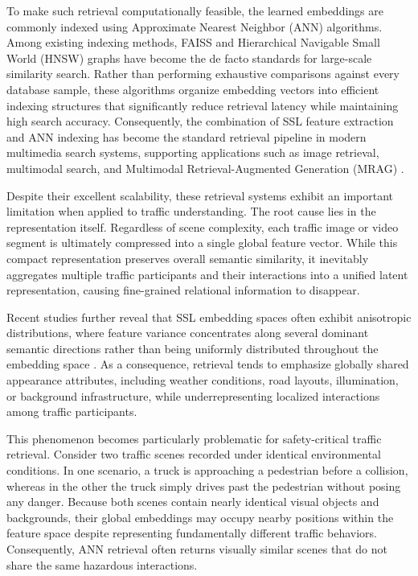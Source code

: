 \documentclass[a4paper, 11pt]{article} %
\begin{document}
To make such retrieval computationally feasible, the learned embeddings are commonly indexed using Approximate Nearest Neighbor (ANN) algorithms. Among existing indexing methods, FAISS \cite{douze2024faiss} and Hierarchical Navigable Small World (HNSW) graphs \cite{malkov2020hnsw} have become the de facto standards for large-scale similarity search. Rather than performing exhaustive comparisons against every database sample, these algorithms organize embedding vectors into efficient indexing structures that significantly reduce retrieval latency while maintaining high search accuracy. Consequently, the combination of SSL feature extraction and ANN indexing has become the standard retrieval pipeline in modern multimedia search systems, supporting applications such as image retrieval, multimodal search, and Multimodal Retrieval-Augmented Generation (MRAG) \cite{mei2025mrag,zhang2026rethinking}.

Despite their excellent scalability, these retrieval systems exhibit an important limitation when applied to traffic understanding. The root cause lies in the representation itself. Regardless of scene complexity, each traffic image or video segment is ultimately compressed into a single global feature vector. While this compact representation preserves overall semantic similarity, it inevitably aggregates multiple traffic participants and their interactions into a unified latent representation, causing fine-grained relational information to disappear.

Recent studies further reveal that SSL embedding spaces often exhibit anisotropic distributions, where feature variance concentrates along several dominant semantic directions rather than being uniformly distributed throughout the embedding space \cite{geometric2024ssl,chung2026global}. As a consequence, retrieval tends to emphasize globally shared appearance attributes, including weather conditions, road layouts, illumination, or background infrastructure, while underrepresenting localized interactions among traffic participants.

This phenomenon becomes particularly problematic for safety-critical traffic retrieval. Consider two traffic scenes recorded under identical environmental conditions. In one scenario, a truck is approaching a pedestrian before a collision, whereas in the other the truck simply drives past the pedestrian without posing any danger. Because both scenes contain nearly identical visual objects and backgrounds, their global embeddings may occupy nearby positions within the feature space despite representing fundamentally different traffic behaviors. Consequently, ANN retrieval often returns visually similar scenes that do not share the same hazardous interactions.
\end{document}
